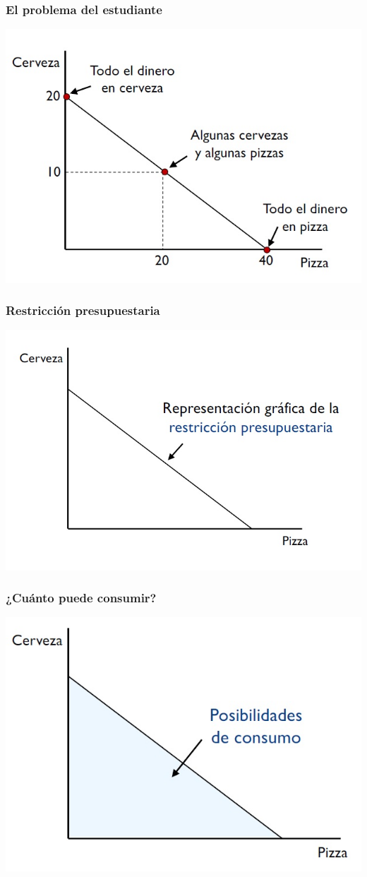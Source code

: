 \documentclass{beamer}
\begin{document}
\begin{frame}
\frametitle{El problema del estudiante}
\centering
\includegraphics[scale=0.6]{../Figures/Tema_02.3_rp1.jpg}
\end{frame}

\begin{frame}
\frametitle{Restricción presupuestaria}
\centering
\includegraphics[scale=0.6]{../Figures/Tema_02.4_rp2.jpg}
\end{frame}

\begin{frame}
\frametitle{¿Cuánto puede consumir?}
\centering
\includegraphics[scale=0.6]{../Figures/Tema_02.5_rp3.jpg}
\end{frame}
\end{document}
